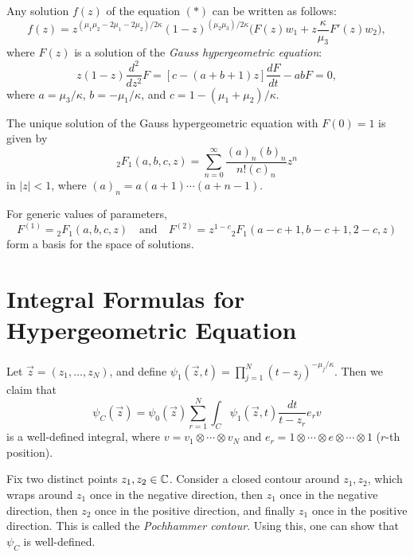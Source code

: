 \begin{theorem}
  Any solution $f(z)$ of the equation
  $(*)$ can be written as follows:
  \[
    f(z)
    = z^{(\mu_1 \mu_2 - 2\mu_1 - 2\mu_2) / 2 \kappa}
    (1 - z)^{(\mu_2 \mu_3) / 2\kappa}
    \bigg(F(z) w_1 + z \frac{\kappa}{\mu_3}F'(z) w_2\bigg),
  \]
  where $F(z)$ is a solution of the
  \emph{Gauss hypergeometric equation}:
  \[
    z(1 - z) \frac{d^2}{dz^2} F
    = [c - (a + b + 1) z] \frac{dF}{dt} - ab F = 0,
  \]
  where $a = \mu_3 / \kappa$,
  $b = -\mu_1 / \kappa$, and
  $c = 1 - (\mu_1 + \mu_2) / \kappa$.
\end{theorem}

\begin{remark}
  The unique solution of the
  Gauss hypergeometric equation with
  $F(0) = 1$ is given by
  \[
    {}_{2}F_1(a, b, c, z)
    = \sum_{n = 0}^\infty \frac{(a)_n (b)_n}{n! (c)_n} z^n
  \]
  in $|z| < 1$, where
  $(a)_n = a (a + 1) \cdots (a + n - 1)$.
\end{remark}

\begin{prop}
  For generic values of parameters,
  \[
    F^{(1)} = {}_{2}F_1(a, b, c, z)
    \quad \text{and} \quad
    F^{(2)} = z^{1 - c} {}_{2}F_1(a - c + 1, b - c + 1, 2 - c, z)
  \]
  form a basis for the space of solutions.
\end{prop}
\pagebreak

\section{Integral Formulas for Hypergeometric Equation}

\begin{remark}
  Let $\vec{z} = (z_1, \dots, z_N)$, and
  define
  $\psi_1(\vec{z}, t)
    = \prod_{j = 1}^N (t - z_j)^{-\mu_j / \kappa}$.
    Then we claim that
    \[
      \psi_C(\vec{z})
      = \psi_0(\vec{z})
      \sum_{r = 1}^N \int_C \psi_1(\vec{z}, t)
      \frac{dt}{t - z_r} e_r v
    \]
    is a well-defined integral,
    where $v = v_1 \otimes \cdots \otimes v_N$
    and $e_r = 1 \otimes \cdots \otimes e \otimes \cdots \otimes 1$ ($r$-th position).
\end{remark}

\begin{remark}
  Fix two distinct points $z_1, z_2 \in \mathbb{C}$.
  Consider a closed
  contour around $z_1, z_2$, which
  wraps around $z_1$ once in the negative
  direction, then $z_1$ once in the negative
  direction, then $z_2$ once in the positive direction, and
  finally $z_1$ once in the positive direction.
  This is called the \emph{Pochhammer contour}.
  Using this, one can show that $\psi_C$
  is well-defined.
\end{remark}

